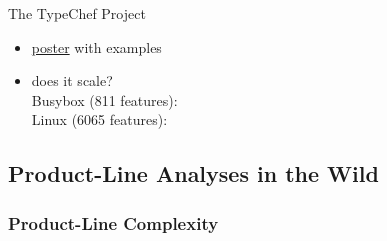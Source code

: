 \begin{frame}{\myframetitle}
\begin{fancycolumns}
\begin{example}{The TypeChef Project \mysource{\typechef}}
\begin{itemize}
				\item \href{https://ckaestne.github.io/TypeChef/typechef-poster.png}{poster} with examples
				\item does it scale?\\[1ex]
				{\small Busybox (811 features): } \\[1ex]
				{\small Linux (6065 features): }  %
			\end{itemize}
		\end{example}
	\end{fancycolumns}
\end{frame}

\subsection{Product-Line Analyses in the Wild}

\subsubsection*{Product-Line Complexity}

